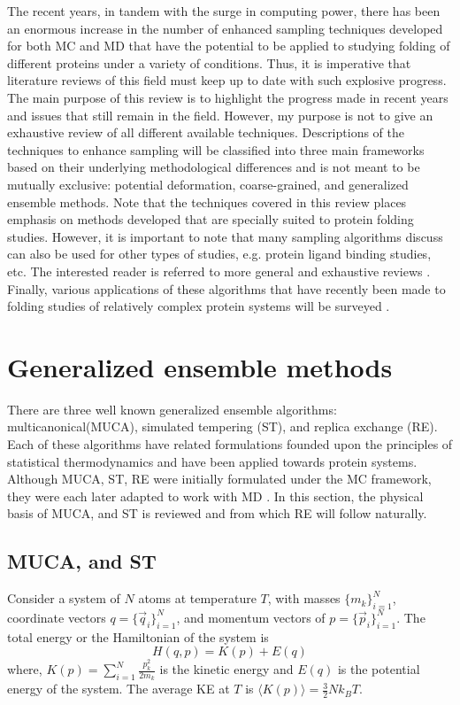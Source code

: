\documentclass[12pt]{article}
\numberwithin{equation}{subsection}
\begin{document}
\begin{spacing}{1}
The recent years, in tandem with the surge in computing power, there has been an enormous increase in the number of enhanced sampling techniques developed for both MC and MD that have the potential to be applied to studying folding of different proteins under a variety of conditions.  Thus, it is imperative that literature reviews of this field must keep up to date with such explosive progress. The main purpose of this review is to highlight the progress made in recent years and issues that still remain in the field. However, my purpose is not to give an exhaustive review of all different available techniques. Descriptions of the techniques to enhance sampling will be classified into three main frameworks based on their underlying methodological differences and is not meant to be mutually exclusive:  potential deformation, coarse-grained, and generalized ensemble methods.  Note that the techniques covered in this review places emphasis on methods developed that are specially suited to protein folding studies.  However, it is important to note that many sampling algorithms discuss can also be used for other types of studies, e.g. protein ligand binding studies, etc. The interested reader is referred to more general and exhaustive reviews \cite{impsamp07,kai, scher07,gunst06,voth,deem}. Finally, various applications of these algorithms that have recently been made to folding studies of relatively complex protein systems will be surveyed \cite{trpcage,villin}.

\section{Generalized ensemble methods}
There are three well known generalized ensemble algorithms: multicanonical(MUCA), simulated tempering (ST), and replica exchange (RE). Each of these algorithms have related formulations founded upon the principles of statistical thermodynamics and have been applied towards protein systems\cite{oka2001,oka99,wenzel}. Although MUCA, ST, RE were initially formulated under the MC framework, they were each later adapted to work with MD \cite{oka2001}. In this section, the physical basis of MUCA, and ST is reviewed and from which RE will follow naturally.

\subsection{MUCA, and ST}
Consider a system of $N$ atoms at temperature $T$, with masses $\{m_k\}_{i=1}^{N}$, coordinate vectors $q = \{\overrightarrow{q}_i\}_{i=1}^N$, and momentum vectors of $p=\{\overrightarrow{p}_i\}_{i=1}^N$.
The total energy or the Hamiltonian of the system is 
\begin{equation}
 H(q,p) = K(p)+E(q)
\end{equation}
where, $K(p) = \sum_{i=1}^N \frac{p_k^2}{2m_k}$ is the kinetic energy and $E(q)$ is the potential energy of the system.
The average KE at $T$ is $\langle K(p)\rangle = \frac{3}{2}Nk_BT$.


\end{spacing}
\end{document}
